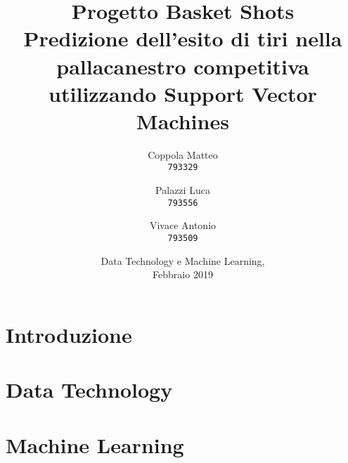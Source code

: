 \documentclass[12pt,a4paper]{report}
\begin{document}
\title{%
  \Huge Progetto Basket Shots\\
  \large Predizione dell'esito di tiri nella pallacanestro competitiva utilizzando Support Vector Machines\\
    }
\author{
  Coppola Matteo\\
  \texttt{793329}
  \and
  Palazzi Luca\\
  \texttt{793556}
   \and
  Vivace Antonio\\
  \texttt{793509}
}
\date{Data Technology e Machine Learning, \\ Febbraio 2019}
\maketitle

\tableofcontents

\chapter{Introduzione}


\chapter{Data Technology}




\chapter{Machine Learning}






\end{document}
